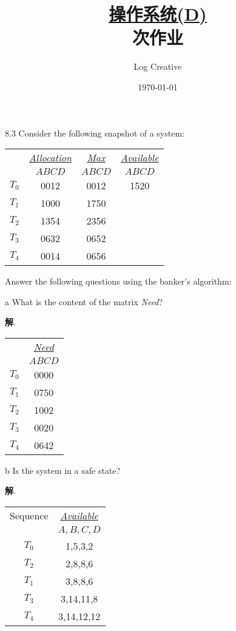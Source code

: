 \documentclass[12pt,a4paper]{article}
\newenvironment{problems}{\begin{list}{}{\renewcommand{\makelabel}[1]{\textbf{##1}\hfil}}}{\end{list}}
\newenvironment{steps}{\begin{list}{}{\renewcommand{\makelabel}[1]{##1.\hfil}}}{\end{list}}
\providecommand{\sol}{\textbf{解}.~}
\begin{document}
\title{\normalsize \underline{操作系统(D)}\\ 次作业}
\author{Log Creative }
\date{\today}
\maketitle

\begin{problems}
    \item[8.3] Consider the following snapshot of a system:
     
    \begin{tabular}{cccc}
         & \underline{\emph{Allocation}} & \underline{\emph{Max}} &  \underline{\emph{Available}}\\
         & $ABCD$ & $ABCD$ & $ABCD$\\
    $T_0$ & 0012 & 0012& 1520\\
    $T_1$ & 1000 & 1750& \\
    $T_2$ & 1354 & 2356& \\
    $T_3$ & 0632 & 0652& \\
    $T_4$ & 0014 & 0656&
    \end{tabular} 

    Answer the following questions using the banker's algorithm:
    \begin{steps}
        \item[a] What is the content of the matrix \emph{Need}?
         
        \sol \begin{tabular}{cc}
            & \underline{\emph{Need}} \\
            & $ABCD$ \\
        $T_0$ & 0000 \\
        $T_1$ & 0750 \\
        $T_2$ & 1002 \\
        $T_3$ & 0020 \\
        $T_4$ & 0642
        \end{tabular} 
        \item[b] Is the system in a safe state?
        
        \sol \begin{tabular}{cc}
          Sequence  & \underline{\emph{Available}} \\
            & $A,B,C,D$ \\
        $T_0$ & 1,5,3,2 \\
        $T_2$ & 2,8,8,6 \\
        $T_1$ & 3,8,8,6 \\
        $T_3$ & 3,14,11,8\\
        $T_4$ & 3,14,12,12
        \end{tabular} 


\end{steps}
\end{problems}
\end{document}
